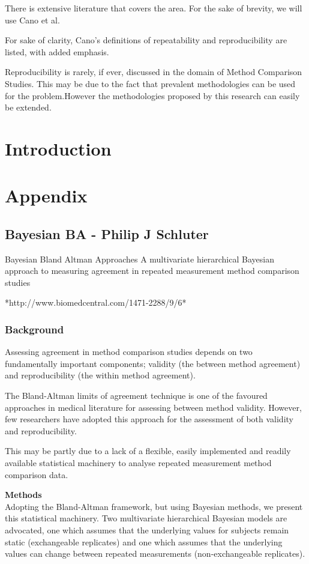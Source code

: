 \documentclass[12pt, a4paper]{report}
\theoremstyle{plain}
\theoremstyle{definition}
\theoremstyle{remark}
\begin{document}
There is extensive literature that covers the area. For the sake of brevity, we will use Cano et al.

For sake of clarity, Cano's definitions of repeatability and reproducibility are listed, with added emphasis.

Reproducibility is rarely, if ever, discussed in the domain of Method Comparison Studies. This may be due to the fact that prevalent methodologies can be used for the problem.However
the methodologies proposed by this research can easily be extended.




\chapter{Introduction}




\chapter{Appendix}


\section*{Bayesian BA - Philip J Schluter}
Bayesian Bland Altman Approaches
A multivariate hierarchical Bayesian approach to measuring agreement in repeated
measurement method comparison studies

*http://www.biomedcentral.com/1471-2288/9/6*



\subsection*{Background}
Assessing agreement in method comparison studies depends on two fundamentally important components; validity (the between method agreement) and reproducibility (the within method agreement). 

The Bland-Altman limits of agreement technique is one of the favoured approaches in medical literature for assessing between method validity. However, few researchers have adopted this approach for the assessment of both validity and reproducibility. 

This may be partly due to a lack of a flexible, easily implemented and readily available statistical machinery to analyse repeated measurement method comparison data.

\textbf{Methods}\\
Adopting the Bland-Altman framework, but using Bayesian methods, we present this statistical machinery. Two multivariate hierarchical Bayesian models are advocated, one which assumes that the underlying values for subjects remain static (exchangeable replicates) and one which assumes that the underlying values can change between repeated measurements (non-exchangeable replicates).
\end{document}
